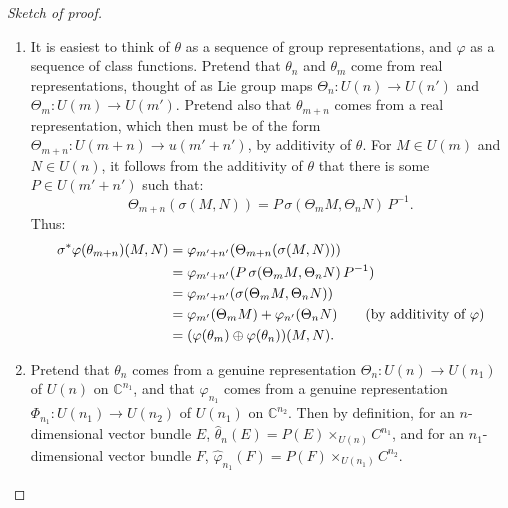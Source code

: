 \documentclass{article}
\newcommand{\C}{\mathbb{C}}
\begin{document}
\begin{proof}[Sketch of proof]
\begin{enumerate}
\item It is easiest to think of $\theta$ as a sequence of group representations, and $\varphi$ as a sequence of class functions. Pretend that $\theta_n$ and $\theta_m$ come from real representations, thought of as Lie group maps $\Theta_n:U(n) \to U(n')$ and $\Theta_m:U(m)\to U(m')$. Pretend also that $\theta_{m+n}$ comes from a real representation, which then must be of the form $\Theta_{m+n}:U(m+n)\to u(m'+n')$, by additivity of $\theta$. For $M \in U(m)$ and $N \in U(n)$, it follows from the additivity of $\theta$ that there is some $P\in U(m'+n')$ such that:
\[\Theta_{m+n}(\sigma(M,N))=P\,\sigma(\Theta_mM,\Theta_nN)\,P^{-1}.\]
Thus:
\begin{align*}
\sigma^* \varphi(\theta_{m+n})(M, N) & = \varphi_{m'+n'} (\Theta_{m+n}(\sigma(M,N))) \\
& = \varphi_{m'+n'} (P\,\sigma(\Theta_mM,\Theta_nN)\,P^{-1}) \\
& = \varphi_{m'+n'} (\sigma(\Theta_mM,\Theta_nN)) \\
& = \varphi_{m'} (\Theta_m M) + \varphi_{n'} (\Theta_n N) \textup{\qquad(by additivity of $\varphi$)}\\
& = (\varphi(\theta_m) \oplus \varphi(\theta_n)) (M, N).
\end{align*}
%
%
\item Pretend that $\theta_{n}$ comes from a genuine representation $\Theta_n:U(n) \to U(n_1)$ of $U(n)$ on $\C^{n_1}$, and that $\varphi_{n_1}$ comes from a genuine representation $\Phi_{n_1}:U(n_1) \to U(n_2)$ of $U(n_1)$ on $\C^{n_2}$. Then by definition, for an $n$-dimensional vector bundle $E$, $\hat \theta_n(E) = P(E) \times_{U(n)} C^{n_1}$, and for an $n_1$-dimensional vector bundle $F$, $\hat \varphi_{n_1}(F) = P(F) \times_{U(n_1)} C^{n_2}$.


\end{enumerate}
\end{proof}
\end{document}
